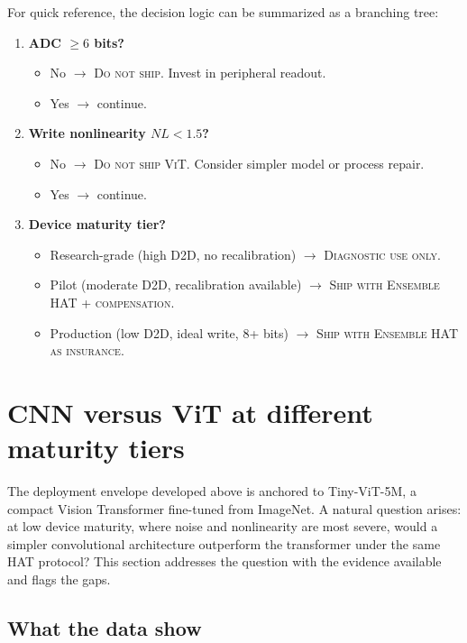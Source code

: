 For quick reference, the decision logic can be summarized as a branching tree:
\begin{enumerate}
    \item \textbf{ADC $\ge 6$ bits?}
    \begin{itemize}
        \item No $\rightarrow$ \textsc{Do not ship.} Invest in peripheral readout.
        \item Yes $\rightarrow$ continue.
    \end{itemize}
    \item \textbf{Write nonlinearity $NL < 1.5$?}
    \begin{itemize}
        \item No $\rightarrow$ \textsc{Do not ship ViT.} Consider simpler model or process repair.
        \item Yes $\rightarrow$ continue.
    \end{itemize}
    \item \textbf{Device maturity tier?}
    \begin{itemize}
        \item Research-grade (high D2D, no recalibration) $\rightarrow$ \textsc{Diagnostic use only.}
        \item Pilot (moderate D2D, recalibration available) $\rightarrow$ \textsc{Ship with Ensemble HAT + compensation.}
        \item Production (low D2D, ideal write, 8+ bits) $\rightarrow$ \textsc{Ship with Ensemble HAT as insurance.}
    \end{itemize}
\end{enumerate}


\section{CNN versus ViT at different maturity tiers}
\label{sec:cnn-vs-vit-tiers}

The deployment envelope developed above is anchored to Tiny-ViT-5M, a compact Vision Transformer fine-tuned from ImageNet.  A natural question arises: at low device maturity, where noise and nonlinearity are most severe, would a simpler convolutional architecture outperform the transformer under the same HAT protocol?  This section addresses the question with the evidence available and flags the gaps.

\subsection{What the data show}

